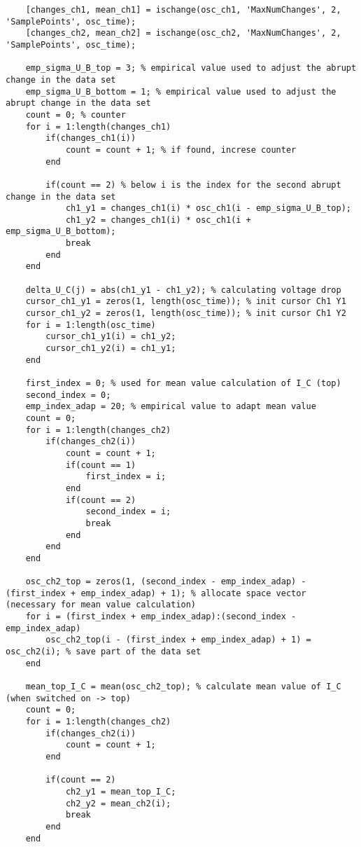 \begin{lstlisting}
    [changes_ch1, mean_ch1] = ischange(osc_ch1, 'MaxNumChanges', 2, 'SamplePoints', osc_time); 
    [changes_ch2, mean_ch2] = ischange(osc_ch2, 'MaxNumChanges', 2, 'SamplePoints', osc_time); 

    emp_sigma_U_B_top = 3; % empirical value used to adjust the abrupt change in the data set
    emp_sigma_U_B_bottom = 1; % empirical value used to adjust the abrupt change in the data set   
    count = 0; % counter
    for i = 1:length(changes_ch1) 
        if(changes_ch1(i))
            count = count + 1; % if found, increse counter
        end
       
        if(count == 2) % below i is the index for the second abrupt change in the data set                                                   
            ch1_y1 = changes_ch1(i) * osc_ch1(i - emp_sigma_U_B_top);     
            ch1_y2 = changes_ch1(i) * osc_ch1(i + emp_sigma_U_B_bottom);
            break
        end
    end

    delta_U_C(j) = abs(ch1_y1 - ch1_y2); % calculating voltage drop
    cursor_ch1_y1 = zeros(1, length(osc_time)); % init cursor Ch1 Y1 
    cursor_ch1_y2 = zeros(1, length(osc_time)); % init cursor Ch1 Y2
    for i = 1:length(osc_time)
        cursor_ch1_y1(i) = ch1_y2;
        cursor_ch1_y2(i) = ch1_y1;
    end
    
    first_index = 0; % used for mean value calculation of I_C (top)
    second_index = 0;
    emp_index_adap = 20; % empirical value to adapt mean value
    count = 0;
    for i = 1:length(changes_ch2)
        if(changes_ch2(i))
            count = count + 1;
            if(count == 1)
                first_index = i;
            end
            if(count == 2)
                second_index = i;
                break
            end
        end
    end
    
    osc_ch2_top = zeros(1, (second_index - emp_index_adap) - (first_index + emp_index_adap) + 1); % allocate space vector (necessary for mean value calculation) 
    for i = (first_index + emp_index_adap):(second_index - emp_index_adap)
        osc_ch2_top(i - (first_index + emp_index_adap) + 1) = osc_ch2(i); % save part of the data set
    end
    
    mean_top_I_C = mean(osc_ch2_top); % calculate mean value of I_C (when switched on -> top)
    count = 0;
    for i = 1:length(changes_ch2)
        if(changes_ch2(i))
            count = count + 1;
        end
        
        if(count == 2)
            ch2_y1 = mean_top_I_C;
            ch2_y2 = mean_ch2(i);
            break
        end
    end


\end{lstlisting}
